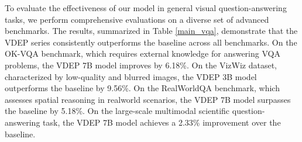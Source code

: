 To evaluate the effectiveness of our model in general visual question-answering tasks, we perform comprehensive evaluations on a diverse set of advanced benchmarks. The results, summarized in Table \ref{main_vqa}, demonstrate that the VDEP series consistently outperforms the baseline across all benchmarks.
On the OK-VQA benchmark, which requires external knowledge for answering VQA problems, the VDEP 7B model improves by 6.18\%. On the VizWiz dataset, characterized by low-quality and blurred images, the VDEP 3B model outperforms the baseline by 9.56\%. On the RealWorldQA benchmark, which assesses spatial reasoning in realworld scenarios, the VDEP 7B model surpasses the baseline by 5.18\%. On the large-scale multimodal scientific question-answering task, the VDEP 7B model achieves a 2.33\% improvement over the baseline.

